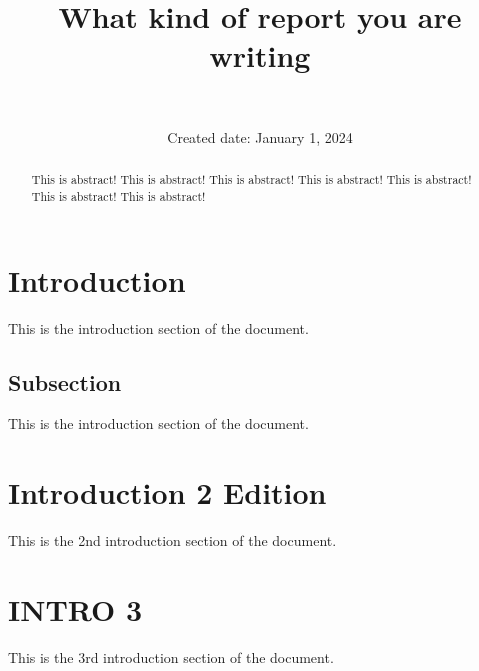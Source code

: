 \documentclass[12pt]{article} %
\title{%
    {\large What kind of report you are writing} \\
    \textbf{{\huge \topic}}%
}
\author{%
    \name \\
    \ttfamily{yygarypeng@gapp.nthu.edu.tw}%
}
\affil{%
    Dept. of Physics, Natl. Tsing Hua Univ.%
}
\date{%
    Created date: January 1, 2024%
}
\begin{document}
\makefront %


\begin{abstract}
    This is abstract! This is abstract! This is abstract! This is abstract! This is abstract! This is abstract! This is abstract!
\end{abstract}

\section{Introduction}
This is the introduction section of the document.
    \subsection{Subsection}
    This is the introduction section of the document.

\newpage
\section{Introduction 2 Edition}
This is the 2nd introduction section of the document.

\newpage
\section{INTRO 3}
This is the 3rd introduction section of the document.

\end{document}
